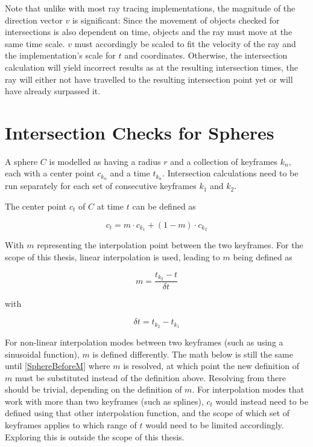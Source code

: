 Note that unlike with most ray tracing implementations, the magnitude of the direction vector \(v\) is significant:
Since the movement of objects checked for intersections is also dependent on time,
objects and the ray must move at the same time scale.
\(v\) must accordingly be scaled to fit the velocity of the ray and the implementation's scale for \(t\) and coordinates.
Otherwise, the intersection calculation will yield incorrect results as at the resulting intersection times,
the ray will either not have travelled to the resulting intersection point yet or will have already surpassed it.

\section{Intersection Checks for Spheres}

A sphere \(C\) is modelled as having a radius \(r\) and a collection of keyframes \(k_n\), each with a center point \(c_{k_n}\) and a time \(t_{k_n}\).
Intersection calculations need to be run separately for each set of consecutive keyframes \(k_1\) and \(k_2\).
\newline

The center point \(c_t\) of \(C\) at time \(t\) can be defined as

\begin{equation}
    c_t = m \cdot c_{k_1} + (1-m) \cdot c_{k_2}
\end{equation}

With \(m\) representing the interpolation point between the two keyframes.
For the scope of this thesis, linear interpolation is used, leading to \(m\) being defined as

\begin{equation}\label{MDef}
    m = \frac{t_{k_2} - t}{\delta t}
\end{equation}

with

\begin{equation}
    \delta t = t_{k_2} - t_{k_1}
\end{equation}

For non-linear interpolation modes between two keyframes (such as using a sinusoidal function),
\(m\) is defined differently. The math below is still the same until \eqref{SphereBeforeM} where \(m\) is resolved,
at which point the new definition of \(m\) must be substituted instead of the definition above.
Resolving from there should be trivial, depending on the definition of \(m\).
\newline
For interpolation modes that work with more than two keyframes (such as splines),
\(c_t\) would instead need to be defined using that other interpolation function,
and the scope of which set of keyframes applies to which range of \(t\) would need to be limited accordingly.
Exploring this is outside the scope of this thesis.
\newline

